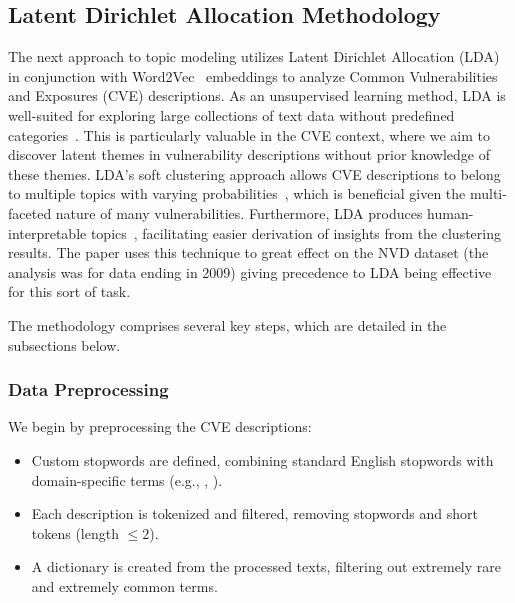 \documentclass[12pt]{article}
\begin{document}
\subsection{Latent Dirichlet Allocation Methodology}

The next approach to topic modeling utilizes Latent Dirichlet Allocation (LDA)~\cite{lda_origin} in
conjunction with Word2Vec~\cite{word2vec} embeddings to analyze Common Vulnerabilities and Exposures
(CVE) descriptions. As an unsupervised learning method, LDA is well-suited for exploring large
collections of text data without predefined categories~\cite{lda_origin, latent_handbook}. This is
particularly valuable in the CVE context, where we aim to discover latent themes in vulnerability
descriptions without prior knowledge of these themes. LDA's soft clustering approach allows CVE
descriptions to belong to multiple topics with varying probabilities~\cite{latent_handbook}, which is beneficial given
the multi-faceted nature of many vulnerabilities. Furthermore, LDA produces human-interpretable
topics~\cite{lda_origin}, facilitating easier derivation of insights from the clustering results.
The paper \cite{cve_topic_modelling} uses this technique to great effect on the NVD
dataset (the analysis was for data ending in 2009) giving precedence to LDA being effective for this
sort of task.

The methodology comprises several key steps, which are detailed in the subsections below.

\subsubsection{Data Preprocessing} We begin by preprocessing the CVE descriptions:

\begin{itemize}

	\item Custom stopwords are defined, combining standard English stopwords with domain-specific
	      terms (e.g., , ).

	\item Each description is tokenized and filtered, removing stopwords and short tokens (length
	      $\leq 2$).

	\item A dictionary is created from the processed texts, filtering out extremely rare and
	      extremely common terms.

\end{itemize}
\end{document}
